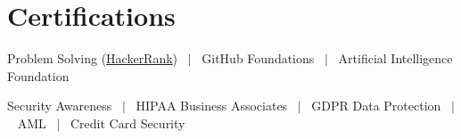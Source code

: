 \documentclass[letterpaper,10pt]{article}
\newenvironment{resume_list}{
  \vspace{-6pt}
  \begin{itemize}[itemsep=-1px, parsep=0.5pt, topsep=1pt, leftmargin=22pt]
}{
  \end{itemize}
  \vspace{-2pt}
}
\begin{document}
\section{Certifications}
\begin{resume_list}
  \item Problem Solving (\href{https://www.hackerrank.com/profile/sooraj_bcss19}{HackerRank}) ~$|$~ GitHub Foundations ~$|$~ Artificial Intelligence Foundation
  \item Security Awareness ~$|$~ HIPAA Business Associates ~$|$~ GDPR Data Protection ~$|$~ AML ~$|$~ Credit Card Security
\end{resume_list}
\end{document}
